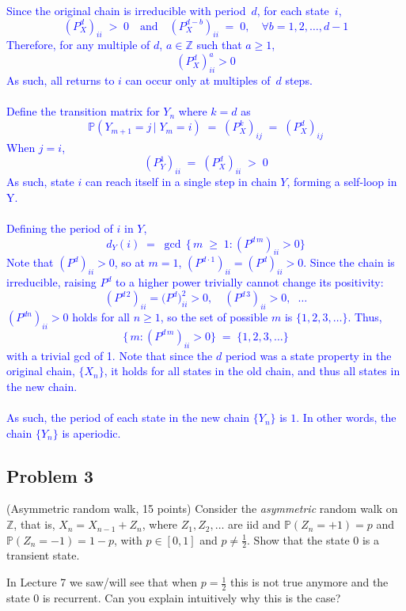 \documentclass{article}
\begin{document}
\begin{enumerate}
           \textcolor{blue}{Since the original chain is irreducible with period~$d$, for each state~$i$,
\[
    (P^d_X)_{ii} \;>\; 0 \quad \text{and} \quad (P^{d-b}_X)_{ii} \;=\; 0, \quad \forall b = 1, 2, \dots, d-1
\]
Therefore, for any multiple of $d$, $a\in \mathbb{Z}$ such that $a \geq 1$, $$(P^d_X)^a_{ii} > 0$$
As such, all returns to $i$ can occur only at multiples of~$d$ steps.   \\ \\ 
Define the transition matrix for $Y_n$ where $k=d$ as
\[
  \mathbb{P}(Y_{m+1} = j \,\big|\; Y_m = i)
    \;=\; (P^k_X)_{ij}
  \;=\; (P^d_X)_{ij}
\]
When $j=i$, 
\[
  (P^1_Y)_{ii} 
    \;=\; (P^d_X)_{ii}
  \;>\; 0
\]
As such, state $i$ can reach itself in a single step in chain $Y$, forming a self-loop in Y. \\ \\ 
Defining the period of $i$ in $Y$,
\[
  d_Y(i)
  \;=\;
  \gcd\,\bigl\{\, m \;\ge\; 1 : (P^{d\,m})_{ii} > 0 \bigr\}
\]
Note that $(P^d)_{ii} > 0$, so at $m=1$, $(P^{d\cdot 1})_{ii} = (P^d)_{ii} > 0$. Since the chain is irreducible, raising $P^d$ to a higher power trivially cannot change its positivity:
\[
   (P^{d\,2})_{ii} = \bigl(P^d\bigr)^2_{ii} > 0, 
   \quad
   (P^{d\,3})_{ii} > 0, 
   \;\;\dots
\]
$(P^{dn})_{ii} > 0$ holds for all $n \ge 1$, so the set of possible $m$ is $\{1,2,3,\dots\}$.
Thus,
\[
  \bigl\{\,m : (P^{d\,m})_{ii} > 0 \bigr\}
  \;=\;
  \{1, 2, 3, \dots\}
\]
with a trivial gcd of 1. Note that since the $d$ period was a state property in the original chain, $\{X_n\}$, it holds for all states in the old chain, and thus all states in the new chain. \\ \\ 
As such, the period of each state in the new chain $\{Y_n\}$ is $1$. In other words, the chain $\{Y_n\}$ is aperiodic.
}
    \end{enumerate}

\subsection*{Problem 3} (Asymmetric random walk, 15 points) Consider the \textit{asymmetric} random walk on $\mathbb{Z}$, that is, $X_n = X_{n-1} + Z_n$, where $Z_1, Z_2, \dots$ are iid and $\mathbb{P}(Z_n = +1) = p$ and $\mathbb{P}(Z_n = -1) = 1 - p$, with $p \in [0,1]$ and $p \neq \frac{1}{2}$. Show that the state 0 is a transient state.

    In Lecture 7 we saw/will see that when $p = \frac{1}{2}$ this is not true anymore and the state 0 is recurrent. Can you explain intuitively why this is the case?
\end{document}
